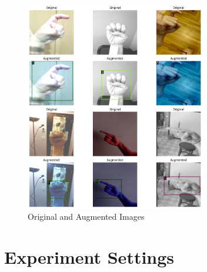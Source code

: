\documentclass[a4paper]{article}
\begin{document}
\begin{figure}[htbp]
    \centering
    \includegraphics[width=0.7\textwidth]{./images/data_pics.png}
    \caption{Original and Augmented Images}
    \label{fig:Images}
\end{figure}

\newpage
\section{Experiment Settings}
\end{document}
